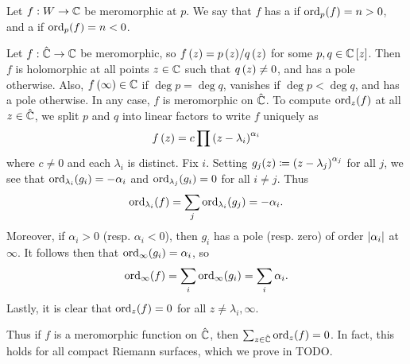 \documentclass[../Moduli_Spaces_of_Riemann_Surfaces.tex]{subfiles}
\begin{document}
    \begin{definition}
        Let $f:W\to\mathbb{C}$ be meromorphic at $p$. We say that $f$ has a  if $\operatorname{ord}_p\!\left(f\right)=n>0$, and a  if $\operatorname{ord}_p\!\left(f\right)=n<0$.
    \end{definition}
    \begin{example}
        Let $f:\hat{\mathbb{C}}\to\mathbb{C}$ be meromorphic, so $f\left(z\right)=p\left(z\right)\!/q\left(z\right)$ for some $p,q\in\mathbb{C}\left[z\right]$. Then $f$ is holomorphic at all points $z\in\mathbb{C}$ such that $q\left(z\right)\neq0$, and has a pole otherwise. Also, $f\left(\infty\right)\in\mathbb{C}$ if $\deg p=\deg q$, vanishes if $\deg p<\deg q$, and has a pole otherwise. In any case, $f$ is meromorphic on $\hat{\mathbb{C}}$. To compute $\operatorname{ord}_z\!\left(f\right)$ at all $z\in\hat{\mathbb{C}}$, we split $p$ and $q$ into linear factors to write $f$ uniquely as
        \begin{equation*}
            f\left(z\right)=c\prod\left(z-\lambda_i\right)^{\alpha_i}
        \end{equation*}
        where $c\neq0$ and each $\lambda_i$ is distinct. Fix $i$. Setting $g_j\!\left(z\right)\coloneqq\left(z-\lambda_j\right)^{\alpha_j}$ for all $j$, we see that $\operatorname{ord}_{\lambda_i}\!\left(g_i\right)=-\alpha_i$ and $\operatorname{ord}_{\lambda_j}\!\left(g_i\right)=0$ for all $i\neq j$. Thus
        \begin{equation*}
            \operatorname{ord}_{\lambda_i}\!\left(f\right)=\sum_j\operatorname{ord}_{\lambda_i}\!\left(g_j\right)=-\alpha_i.
        \end{equation*}
        Moreover, if $\alpha_i>0$ (resp. $\alpha_i<0$), then $g_i$ has a pole (resp. zero) of order $\left|\alpha_i\right|$ at $\infty$. It follows then that $\operatorname{ord}_\infty\!\left(g_i\right)=\alpha_i$, so
        \begin{equation*}
            \operatorname{ord}_\infty\!\left(f\right)=\sum_i\operatorname{ord}_\infty\!\left(g_i\right)=\sum_i\alpha_i.
        \end{equation*}
        Lastly, it is clear that $\operatorname{ord}_z\!\left(f\right)=0$ for all $z\neq \lambda_i,\infty$.\exqed
    \end{example}
    \begin{remark}
        Thus if $f$ is a meromorphic function on $\hat{\mathbb{C}}$, then $\sum_{z\in\hat{\mathbb{C}}}\operatorname{ord}_z\!\left(f\right)=0$. In fact, this holds for all compact Riemann surfaces, which we prove in TODO.\exqed
    \end{remark}
\end{document}
